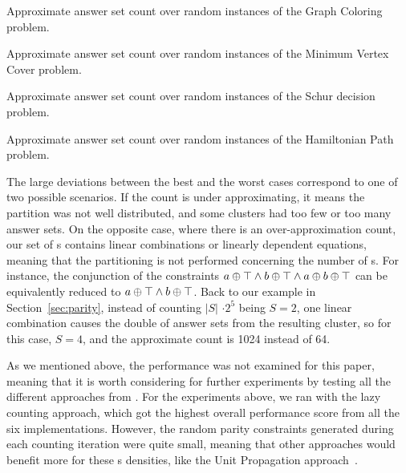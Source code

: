 \begin{table*}[t]
  \centering
  
  \caption{Approximate answer set count over random instances of the Graph Coloring problem.}\label{table:graph_color}
\end{table*}


\begin{table*}[t]
  \centering
  
  \caption{Approximate answer set count over random instances of the Minimum Vertex Cover problem.}\label{table:min_vertex_cover}
\end{table*}

\begin{table*}[t]
  \centering
  
  \caption{Approximate answer set count over random instances of the Schur decision problem.}\label{table:schur}
\end{table*}


\begin{table*}[t]
  \centering
  
  \caption{Approximate answer set count over random instances of the Hamiltonian Path problem.}\label{table:hampath}
\end{table*}




The large deviations between the best and the worst cases correspond to one of two possible scenarios.
%
If the count is under approximating,
it means the partition was not well distributed, and some clusters had too few or too many answer sets. 
%
On the opposite case, where there is an over-approximation count,
our set of \XOR{}s contains linear combinations or linearly dependent equations,
meaning that the partitioning is not performed concerning the number of \XOR{}s.
% 
For instance, the conjunction of the \XOR{} constraints $a \oplus \top \land b \oplus \top \land a \oplus b \oplus \top$ can be equivalently reduced to $a \oplus \top \land b \oplus \top$. 
%
Back to our example in Section~\ref{sec:parity}, instead of counting $|S|$ $\cdot 2^5$ being $S=2$,
one linear combination causes the double of answer sets from the resulting cluster, so for this case, $S=4$, and the approximate count is 1024 instead of 64. 



As we mentioned above, the performance was not examined for this paper,
meaning that it is worth considering for further experiments by testing all the different approaches from \xorro{}.
For the experiments above, we ran \xorro{} with the lazy counting approach,
which got the highest overall performance score from all the six implementations.
However, the random parity constraints generated during each counting iteration were quite small,
meaning that other approaches would benefit more for these \XOR{}s densities, like the Unit Propagation approach~\cite{DBLP:conf/lpnmr/EverardoJKS19}.